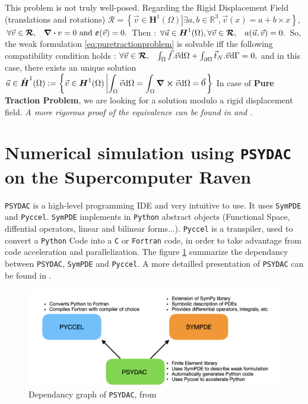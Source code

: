 \documentclass[a4paper,12pt,twoside]{report}
\newcommand{\mtr}{\mathbb{R}}
\newcommand{\dif}{\mathrm{d}}
\begin{document}
This problem is not truly well-posed. Regarding the Rigid Displacement Field (translations and rotations) $\boldsymbol{\mathcal{R}} = \left\{\vec v \in \boldsymbol H^1(\Omega) \left| \exists a, b \in \mtr^3, \vec v(x) = a + b \times x \right. \right\}$, $\forall \vec v \in \boldsymbol{\mathcal{R}}, \hspace{0.3cm} \div v = 0 \text{ and } \boldsymbol \varepsilon(\vec v) = 0.$
Then : $\forall \vec u \in \boldsymbol H^1(\Omega), \forall \vec v \in \boldsymbol{\mathcal{R}},\hspace{0.3cm} a(\vec u, \vec v)= 0.$
So, the weak formulation \eqref{eq:puretractionproblem} is solvable iff the following compatibility condition holds : $\forall \vec v \in \boldsymbol{\mathcal{R}}, \hspace{0.3cm}\int_\Omega \vec f . \vec v \dif \Omega + \int_{\partial\Omega} \vec t_N.\vec v \dif \Gamma = 0,$
and in this case, there exists an unique solution $\vec u \in \hat{\boldsymbol H}^1(\Omega) := \left\{\vec v \in \boldsymbol H^1(\Omega) \left| \displaystyle \int_\Omega \vec v \dif \Omega = \int_\Omega  \curl \vec v \dif \Omega = \vec 0 \right. \right\}$ 
In case of \textbf{Pure Traction Problem}, we are looking for a solution modulo a rigid displacement field.
\textit{A more rigorous proof of the equivalence can be found in \cite{brenner_mathematical_2008} and \cite{chen_variational}.}


\section{Numerical simulation using \texttt{PSYDAC} on the Supercomputer Raven}

\texttt{PSYDAC} is a high-level programming IDE and very intuitive to use. It uses \texttt{SymPDE} and \texttt{Pyccel}. \texttt{SymPDE} implements in \texttt{Python} abstract objects (Functional Space, diffential operators, linear and bilinear forms...). \texttt{Pyccel} is a transpiler, used to convert a \texttt{Python} Code into a \texttt{C} or \texttt{Fortran} code, in order to take advantage from code acceleration and parallelization. The figure \ref{fig:Dependancy_Psydac} summarize the dependancy between \texttt{PSYDAC}, \texttt{SymPDE} and \texttt{Pyccel}. A more detailled presentation of \texttt{PSYDAC} can be found in \cite{guclu_psydac_2022}.

\begin{figure}[!h]
    \centering
    \includegraphics[width=0.75\linewidth]{figures/psydac_fonc_1.png}
    \caption{Dependancy graph of \texttt{PSYDAC}, from \cite{guclu_psydac_2022}}
    \label{fig:Dependancy_Psydac}
\end{figure}
\end{document}
